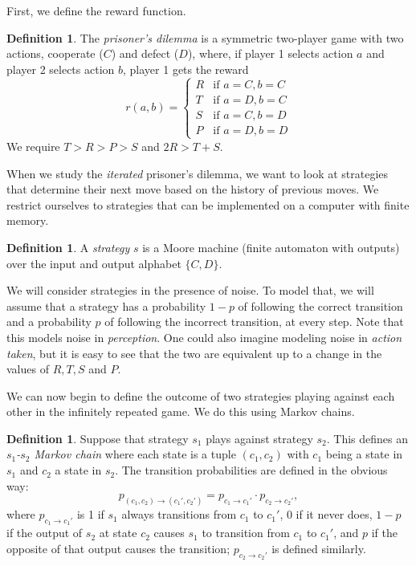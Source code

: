 \documentclass[11pt]{amsart}
\theoremstyle{definition}
\newtheorem{definition}[theorem]{Definition}
\theoremstyle{remark}
\begin{document}
First, we define the reward function.

\begin{definition}
  The \textit{prisoner's dilemma} is a symmetric two-player game with two actions, cooperate ($C$) and defect ($D$), where, if player 1 selects action $a$ and player 2 selects action $b$, player 1 gets the reward
  \begin{equation*}
    r(a,b) = \begin{cases}
      R &\text{if $a = C, b = C$} \\
      T &\text{if $a = D, b = C$} \\
      S &\text{if $a = C, b = D$} \\
      P &\text{if $a = D, b = D$}
    \end{cases}
  \end{equation*}
  We require $T > R > P > S$ and $2R > T + S$.
\end{definition}

When we study the \textit{iterated} prisoner's dilemma, we want to look at strategies that determine their next move based on the history of previous moves. We restrict ourselves to strategies that can be implemented on a computer with finite memory.

\begin{definition}
  A \textit{strategy} $s$ is a Moore machine (finite automaton with outputs) over the input and output alphabet $\{C, D\}$. 
\end{definition}

We will consider strategies in the presence of noise. To model that, we will assume that a strategy has a probability $1-p$ of following the correct transition and a probability $p$ of following the incorrect transition, at every step. Note that this models noise in \textit{perception}. One could also imagine modeling noise in \textit{action taken}, but it is easy to see that the two are equivalent up to a change in the values of $R, T, S$ and $P$.

We can now begin to define the outcome of two strategies playing against each other in the infinitely repeated game. We do this using Markov chains.

\begin{definition}
  Suppose that strategy $s_1$ plays against strategy $s_2$. This defines an \textit{$s_1$-$s_2$ Markov chain} where each state is a tuple $(c_1,c_2)$ with $c_1$ being a state in $s_1$ and $c_2$ a state in $s_2$. The transition probabilities are defined in the obvious way:
  \begin{equation*}
    p_{(c_1,c_2) \to (c_1', c_2')} = p_{c_1 \to c_1'} \cdot p_{c_2 \to c_2'},
  \end{equation*}
  where $p_{c_1 \to c_1'}$ is 1 if $s_1$ always transitions from $c_1$ to $c_1'$, 0 if it never does, $1-p$ if the output of $s_2$ at state $c_2$ causes $s_1$ to transition from $c_1$ to $c_1'$, and $p$ if the opposite of that output causes the transition; $p_{c_2 \to c_2'}$ is defined similarly.
\end{definition}
\end{document}
